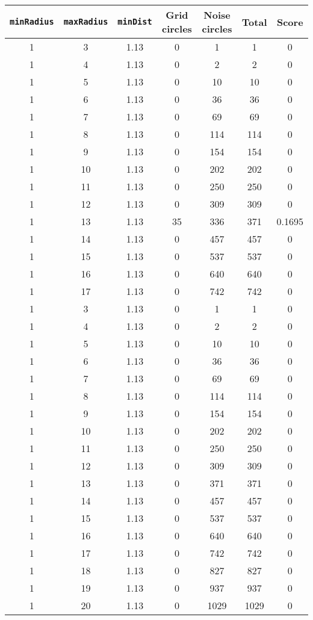 \documentclass[letterpaper, 12pt]{article}
\begin{document}
\begin{longtable}{|c|c|c|c|c|c|c|}
\hline
\textbf{\texttt{minRadius}} & \textbf{\texttt{maxRadius}} & \textbf{\texttt{minDist}} & \textbf{Grid circles} & \textbf{Noise circles} & \textbf{Total} & \textbf{Score} \\
\hline
1 & 3 & 1.13 & 0 & 1 & 1 & 0 \\
\hline
1 & 4 & 1.13 & 0 & 2 & 2 & 0 \\
\hline
1 & 5 & 1.13 & 0 & 10 & 10 & 0 \\
\hline
1 & 6 & 1.13 & 0 & 36 & 36 & 0 \\
\hline
1 & 7 & 1.13 & 0 & 69 & 69 & 0 \\
\hline
1 & 8 & 1.13 & 0 & 114 & 114 & 0 \\
\hline
1 & 9 & 1.13 & 0 & 154 & 154 & 0 \\
\hline
1 & 10 & 1.13 & 0 & 202 & 202 & 0 \\
\hline
1 & 11 & 1.13 & 0 & 250 & 250 & 0 \\
\hline
1 & 12 & 1.13 & 0 & 309 & 309 & 0 \\
\hline
1 & 13 & 1.13 & 35 & 336 & 371 & 0.1695 \\
\hline
1 & 14 & 1.13 & 0 & 457 & 457 & 0 \\
\hline
1 & 15 & 1.13 & 0 & 537 & 537 & 0 \\
\hline
1 & 16 & 1.13 & 0 & 640 & 640 & 0 \\
\hline
1 & 17 & 1.13 & 0 & 742 & 742 & 0 \\
\hline
1 & 3 & 1.13 & 0 & 1 & 1 & 0 \\
\hline
1 & 4 & 1.13 & 0 & 2 & 2 & 0 \\
\hline
1 & 5 & 1.13 & 0 & 10 & 10 & 0 \\
\hline
1 & 6 & 1.13 & 0 & 36 & 36 & 0 \\
\hline
1 & 7 & 1.13 & 0 & 69 & 69 & 0 \\
\hline
1 & 8 & 1.13 & 0 & 114 & 114 & 0 \\
\hline
1 & 9 & 1.13 & 0 & 154 & 154 & 0 \\
\hline
1 & 10 & 1.13 & 0 & 202 & 202 & 0 \\
\hline
1 & 11 & 1.13 & 0 & 250 & 250 & 0 \\
\hline
1 & 12 & 1.13 & 0 & 309 & 309 & 0 \\
\hline
1 & 13 & 1.13 & 0 & 371 & 371 & 0 \\
\hline
1 & 14 & 1.13 & 0 & 457 & 457 & 0 \\
\hline
1 & 15 & 1.13 & 0 & 537 & 537 & 0 \\
\hline
1 & 16 & 1.13 & 0 & 640 & 640 & 0 \\
\hline
1 & 17 & 1.13 & 0 & 742 & 742 & 0 \\
\hline
1 & 18 & 1.13 & 0 & 827 & 827 & 0 \\
\hline
1 & 19 & 1.13 & 0 & 937 & 937 & 0 \\
\hline
1 & 20 & 1.13 & 0 & 1029 & 1029 & 0 \\
\hline
\end{longtable}
\end{document}
